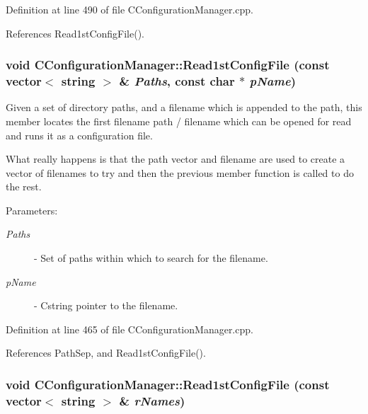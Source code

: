Definition at line 490 of file CConfiguration\-Manager.cpp.

References Read1st\-Config\-File().
\subsubsection{\setlength{\rightskip}{0pt plus 5cm}void CConfiguration\-Manager::Read1st\-Config\-File (const vector$<$ string $>$ \& {\em Paths}, const char $\ast$ {\em p\-Name})}\label{classCConfigurationManager_a15}


Given a set of directory paths, and a filename which is appended to the path, this member locates the first filename path / filename which can be opened for read and runs it as a configuration file.

What really happens is that the path vector and filename are used to create a vector of filenames to try and then the previous member function is called to do the rest. \begin{Desc}
\item[Parameters: ]\par
\begin{description}
\item[{\em 
Paths}]- Set of paths within which to search for the filename. \item[{\em 
p\-Name}]- Cstring pointer to the filename. \end{description}
\end{Desc}


Definition at line 465 of file CConfiguration\-Manager.cpp.

References Path\-Sep, and Read1st\-Config\-File().
\subsubsection{\setlength{\rightskip}{0pt plus 5cm}void CConfiguration\-Manager::Read1st\-Config\-File (const vector$<$ string $>$ \& {\em r\-Names})}\label{classCConfigurationManager_a14}


